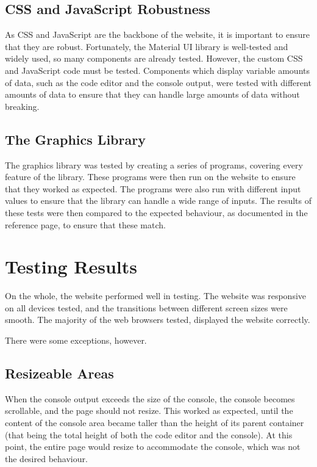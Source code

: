 \documentclass[../main.tex]{subfiles}
\begin{document}
        \subsection{CSS and JavaScript Robustness}
            As CSS and JavaScript are the backbone of the website, it is important to
                ensure that they are robust.
            Fortunately, the Material UI library is well-tested and widely used, so many
                components are already tested.
            However, the custom CSS and JavaScript code must be tested.
            Components which display variable amounts of data, such as the code editor and
                the console output, were tested with different amounts of data to ensure that
                they can handle large amounts of data without breaking.

        \subsection{The Graphics Library}
            The graphics library was tested by creating a series of programs, covering
                every feature of the library.
            These programs were then run on the website to ensure that they worked as
                expected.
            The programs were also run with different input values to ensure that the
                library can handle a wide range of inputs.
            The results of these tests were then compared to the expected behaviour, as
                documented in the reference page, to ensure that these match.

    \section{Testing Results}
        On the whole, the website performed well in testing.
        The website was responsive on all devices tested, and the transitions between
            different screen sizes were smooth.
        The majority of the web browsers tested, displayed the website correctly.

        There were some exceptions, however.

        \subsection{Resizeable Areas}
            When the console output exceeds the size of the console, the console becomes
                scrollable, and the page should not resize.
            This worked as expected, until the content of the console area became taller
                than the height of its parent container (that being the total height of both
                the code editor and the console).
            At this point, the entire page would resize to accommodate the console, which
                was not the desired behaviour.
\end{document}
